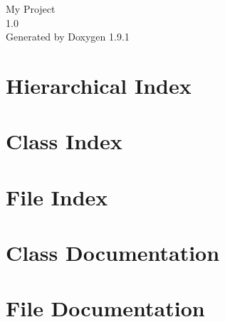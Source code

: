 \let\mypdfximage\pdfximage\def\pdfximage{\immediate\mypdfximage}\documentclass[twoside]{book}
\newcommand{\+}{\discretionary{\mbox{\scriptsize$\hookleftarrow$}}{}{}}
\newcommand{\clearemptydoublepage}{%
  \newpage{\pagestyle{empty}\cleardoublepage}%
}
\begin{document}
\raggedbottom

\hypersetup{pageanchor=false,
             bookmarksnumbered=true,
             pdfencoding=unicode
            }
\begin{titlepage}
\vspace*{7cm}
\begin{center}%
{\Large My Project \\[1ex]\large 1.\+0 }\\
\vspace*{1cm}
{\large Generated by Doxygen 1.9.1}\\
\end{center}
\end{titlepage}
\clearemptydoublepage
{}
\tableofcontents
\clearemptydoublepage
{}
\hypersetup{pageanchor=true}

\chapter{Hierarchical Index}

\chapter{Class Index}

\chapter{File Index}

\chapter{Class Documentation}








\chapter{File Documentation}



















\backmatter
\newpage
{}
\clearemptydoublepage
{}
\printindex
\end{document}

